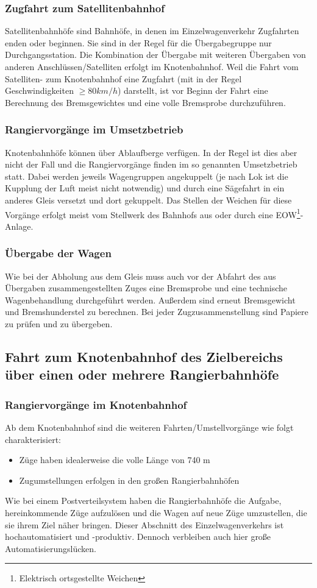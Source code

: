\subsubsection{Zugfahrt zum Satellitenbahnhof}\label{sec:Zugfahrt}
Satellitenbahnhöfe sind Bahnhöfe, in denen im Einzelwagenverkehr \gls{Zugfahrt}en enden oder beginnen. Sie sind in der Regel für die Übergabegruppe nur Durchgangsstation. Die Kombination der Übergabe mit weiteren Übergaben von anderen Anschlüssen/Satelliten erfolgt im \gls{Knotenbahnhof}. Weil die Fahrt vom Satelliten- zum \gls{Knotenbahnhof} eine \gls{Zugfahrt} (mit in der Regel Geschwindigkeiten $\ge 80 km/h$) darstellt, ist vor Beginn der Fahrt eine Berechnung des Bremsgewichtes und eine volle \gls{Bremsprobe} durchzuführen.%
\subsubsection{Rangiervorgänge im Umsetzbetrieb}\label{sec:Rangierfahrt}
Knotenbahnhöfe können über \gls{Ablaufberg}e verfügen. In der Regel ist dies aber nicht der Fall und die Rangiervorgänge finden im so genannten Umsetzbetrieb statt. Dabei werden jeweils Wagengruppen angekuppelt (je nach Lok ist die Kupplung der Luft meist nicht notwendig) und durch eine Sägefahrt in ein anderes Gleis versetzt und dort gekuppelt. Das Stellen der Weichen für diese Vorgänge erfolgt meist vom Stellwerk des Bahnhofs aus oder durch eine \gls{EOW}\footnote{Elektrisch ortsgestellte Weichen}-Anlage.
\subsubsection{Übergabe der Wagen}\label{sec:UEdWagen}
Wie bei der Abholung aus dem Gleis muss auch vor der Abfahrt des aus Übergaben zusammengestellten Zuges eine \gls{Bremsprobe} und eine \gls{technische Wagenbehandlung} durchgeführt werden. Außerdem sind erneut Bremsgewicht und Bremshunderstel zu berechnen. Bei jeder Zugzusammenstellung sind Papiere zu prüfen und zu übergeben.

\subsection{Fahrt zum Knotenbahnhof des Zielbereichs über einen oder mehrere Rangierbahnhöfe}
\subsubsection{Rangiervorgänge im Knotenbahnhof}\label{sec:RangKnoten}
Ab dem \gls{Knotenbahnhof} sind die weiteren Fahrten/Umstellvorgänge wie folgt charakterisiert:
\begin{itemize}
    \item Züge haben idealerweise die volle Länge von 740 m
    \item Zugumstellungen erfolgen in den großen Rangierbahnhöfen
\end{itemize}
Wie bei einem Postverteilsystem haben die Rangierbahnhöfe die Aufgabe, hereinkommende Züge aufzulösen und die Wagen auf neue Züge umzustellen, die sie ihrem Ziel näher bringen. Dieser Abschnitt des Einzelwagenverkehrs ist hochautomatisiert und \mbox{-produktiv}. Dennoch verbleiben auch hier große Automatisierungslücken. 
